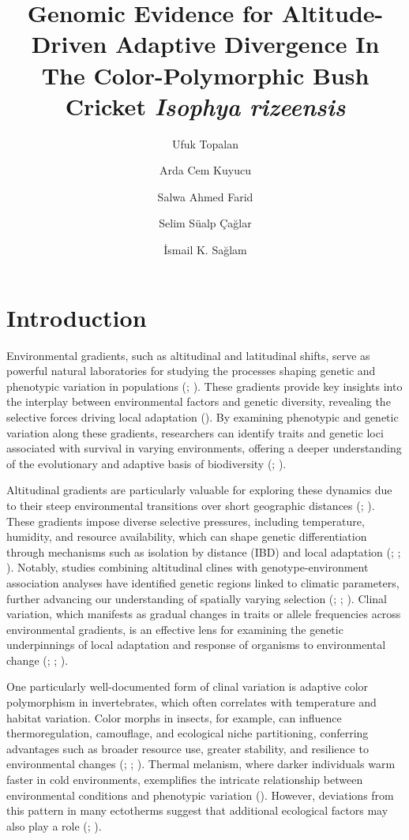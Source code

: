 \documentclass[9pt,a4paper,twoside]{rho-class/rho}
\title{Genomic Evidence for Altitude-Driven Adaptive Divergence In The Color-Polymorphic Bush Cricket \textit{Isophya rizeensis}}
\author[1]{Ufuk Topalan}
\author[2]{Arda Cem Kuyucu}
\author[1]{Salwa Ahmed Farid}
\author[2]{Selim Süalp Çağlar}
\author[1,$\star$]{İsmail K. Sağlam}
\affil[1]{Department of Molecular Biology and Genetics, Koç University, Istanbul, Türkiye}
\affil[2]{Department of Biology, Hacettepe University, Ankara, Türkiye}
\affil[$\star$]{corresponding author}
\begin{document}
	
    \maketitle
    \thispagestyle{firststyle}
    \linenumbers


\section{Introduction}

    Environmental gradients, such as altitudinal and latitudinal shifts, serve as powerful natural laboratories for studying the processes shaping genetic and phenotypic variation in populations (\cite{Wogan2018}; \cite{Kelly2019}). These gradients provide key insights into the interplay between environmental factors and genetic diversity, revealing the selective forces driving local adaptation (\cite{Muir2014}). By examining phenotypic and genetic variation along these gradients, researchers can identify traits and genetic loci associated with survival in varying environments, offering a deeper understanding of the evolutionary and adaptive basis of biodiversity (\cite{Merilä2014}; \cite{Waldvogel2020}).
    
    Altitudinal gradients are particularly valuable for exploring these dynamics due to their steep environmental transitions over short geographic distances (\cite{Chown2003}; \cite{Flatt2016}). These gradients impose diverse selective pressures, including temperature, humidity, and resource availability, which can shape genetic differentiation through mechanisms such as isolation by distance (IBD) and local adaptation (\cite{Sexton2014}; \cite{Stankowski2017}; \cite{Bradburd2019}). Notably, studies combining altitudinal clines with genotype-environment association analyses have identified genetic regions linked to climatic parameters, further advancing our understanding of spatially varying selection (\cite{Hancock2011}; \cite{Slatyer2014}; \cite{Pluess2016}). Clinal variation, which manifests as gradual changes in traits or allele frequencies across environmental gradients, is an effective lens for examining the genetic underpinnings of local adaptation and response of organisms to environmental change (\cite{Mayekar2022}; \cite{Tyrmi2020}; \cite{Soliani2020}).
    
    One particularly well-documented form of clinal variation is adaptive color polymorphism in invertebrates, which often correlates with temperature and habitat variation. Color morphs in insects, for example, can influence thermoregulation, camouflage, and ecological niche partitioning, conferring advantages such as broader resource use, greater stability, and resilience to environmental changes (\cite{Forsman2008}; \cite{Zeuss2014}; \cite{Kozlov2022}). Thermal melanism, where darker individuals warm faster in cold environments, exemplifies the intricate relationship between environmental conditions and phenotypic variation (\cite{Clusella-Trullas2020}). However, deviations from this pattern in many ectotherms suggest that additional ecological factors may also play a role (\cite{Karlsson2008}; \cite{Goodman2021}).
    
\end{document}
